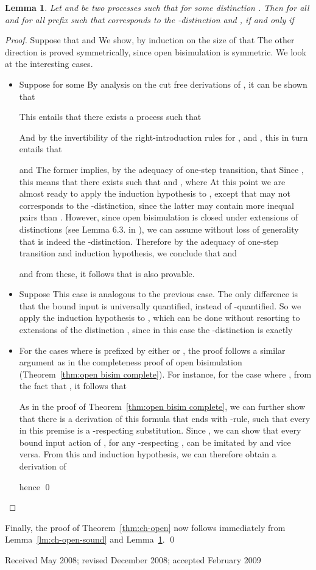 \documentclass{acmtrans2m}
\newtheorem{lemma}[theorem]{Lemma}
\begin{document}
\begin{lemma}
\label{lm:ch-open-complete}
Let  and  be two processes such that  for some distinction .
Then for all  and for all prefix  such that
 corresponds to the -distinction and ,
 if and only if 

\end{lemma}
\begin{proof}
Suppose that  and  
We show, by induction on the size of 
that   The other direction
is proved symmetrically, since open bisimulation is symmetric. 
We look at the interesting cases.
\begin{itemize}

\item Suppose  for some 
By analysis on the cut free derivations of , 
it can be shown that

This entails that there exists a process  such that

And by the invertibility of the right-introduction rules for ,  and , this in turn entails that

and
 The former implies, by the adequacy of one-step transition, that
 Since , this means
that there exists  such that  and
, where  At this point we are almost ready to
apply the induction hypothesis to , except that  may not corresponds to the
-distinction, since the latter may contain more
inequal pairs than .  However, since open bisimulation is closed
under extensions of distinctions (see Lemma
6.3. in \cite{sangiorgi96acta}), we can assume without loss of
generality that  is indeed the -distinction. Therefore by the adequacy of one-step transition and
induction hypothesis, we conclude that 
and

and from these, it follows that  is also provable.

\item Suppose  This case is analogous to the previous case. The only
difference is that the bound input is universally quantified, instead of -quantified.
So we apply the induction hypothesis to , which can be done
without resorting to extensions of the distinction , since in this case the -distinction
is exactly 

\item For the cases where  is prefixed by either  or , the proof follows
a similar argument as in the completeness proof of open bisimulation (Theorem~\ref{thm:open bisim complete}).
For instance, for the case where , from the fact that 
, it follows that 

As in the proof of Theorem~\ref{thm:open bisim complete}, we can further show that there is 
a derivation of this formula that ends with -rule, such that every  in this
premise is a -respecting substitution. 
Since , we can show that every bound input 
action of , for any -respecting , can be imitated by  and vice versa. 
From this and induction hypothesis, we can therefore obtain a derivation of 

hence   \qed
\end{itemize}
\end{proof}

Finally, the proof of Theorem~\ref{thm:ch-open} now follows 
immediately from Lemma~\ref{lm:ch-open-sound} and
Lemma~\ref{lm:ch-open-complete}. 
\qed 



 \begin{received}
 Received May 2008;
 revised December 2008;
 accepted February 2009
 \end{received}

 
\end{document}
